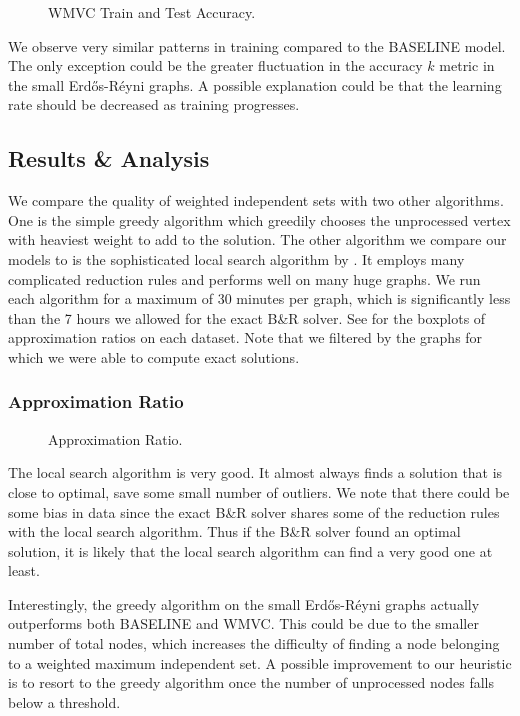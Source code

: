 \documentclass{article}
\begin{document}
\begin{figure}
     \centering
     \caption{WMVC Train and Test Accuracy.}
     \label{fig:wmvc_test}
\end{figure}

We observe very similar patterns in training compared to the BASELINE model.
The only exception could be the greater fluctuation in the accuracy $k$ metric in the small Erd\H os-R\'eyni graphs.
A possible explanation could be that the learning rate should be decreased as training progresses.

\subsection{Results \& Analysis}
We compare the quality of weighted independent sets with two other algorithms.
One is the simple greedy algorithm which greedily chooses the unprocessed vertex with heaviest weight
to add to the solution.
The other algorithm we compare our models to is the sophisticated local search algorithm by \citet{kamis}.
It employs many complicated reduction rules
and performs well on many huge graphs.
We run each algorithm for a maximum of 30 minutes per graph,
which is significantly less than the 7 hours we allowed for the exact B\&R solver.
See  for the boxplots of approximation ratios on each dataset.
Note that we filtered by the graphs for which we were able to compute exact solutions.

\subsubsection{Approximation Ratio}
\begin{figure}
     \centering
     \caption{Approximation Ratio.}
     \label{fig:approx_ratio}
\end{figure}

The local search algorithm is very good.
It almost always finds a solution that is close to optimal,
save some small number of outliers.
We note that there could be some bias in data
since the exact B\&R solver shares some of the reduction rules with the local search algorithm.
Thus if the B\&R solver found an optimal solution,
it is likely that the local search algorithm can find a very good one at least.

Interestingly,
the greedy algorithm on the small Erd\H os-R\'eyni graphs actually outperforms both BASELINE and WMVC.
This could be due to the smaller number of total nodes,
which increases the difficulty of finding a node belonging to a weighted maximum independent set.
A possible improvement to our heuristic is to resort to the greedy algorithm once the number of unprocessed nodes falls below a threshold.
\end{document}
